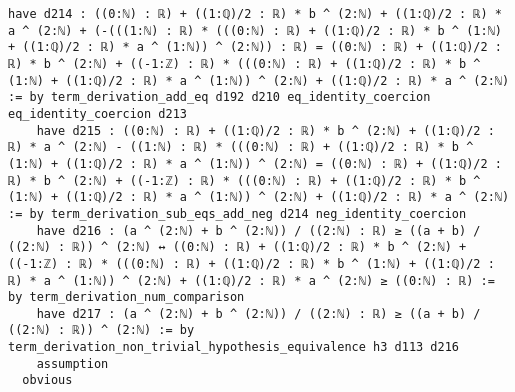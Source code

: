 \documentclass{article}
\begin{document}
\begin{tcolorbox}[colback=white!10, width=\linewidth]
\begin{lstlisting}[language=Lean4]
    have d214 : ((0:ℕ) : ℝ) + ((1:ℚ)/2 : ℝ) * b ^ (2:ℕ) + ((1:ℚ)/2 : ℝ) * a ^ (2:ℕ) + (-(((1:ℕ) : ℝ) * (((0:ℕ) : ℝ) + ((1:ℚ)/2 : ℝ) * b ^ (1:ℕ) + ((1:ℚ)/2 : ℝ) * a ^ (1:ℕ)) ^ (2:ℕ)) : ℝ) = ((0:ℕ) : ℝ) + ((1:ℚ)/2 : ℝ) * b ^ (2:ℕ) + ((-1:ℤ) : ℝ) * (((0:ℕ) : ℝ) + ((1:ℚ)/2 : ℝ) * b ^ (1:ℕ) + ((1:ℚ)/2 : ℝ) * a ^ (1:ℕ)) ^ (2:ℕ) + ((1:ℚ)/2 : ℝ) * a ^ (2:ℕ) := by term_derivation_add_eq d192 d210 eq_identity_coercion eq_identity_coercion d213
    have d215 : ((0:ℕ) : ℝ) + ((1:ℚ)/2 : ℝ) * b ^ (2:ℕ) + ((1:ℚ)/2 : ℝ) * a ^ (2:ℕ) - ((1:ℕ) : ℝ) * (((0:ℕ) : ℝ) + ((1:ℚ)/2 : ℝ) * b ^ (1:ℕ) + ((1:ℚ)/2 : ℝ) * a ^ (1:ℕ)) ^ (2:ℕ) = ((0:ℕ) : ℝ) + ((1:ℚ)/2 : ℝ) * b ^ (2:ℕ) + ((-1:ℤ) : ℝ) * (((0:ℕ) : ℝ) + ((1:ℚ)/2 : ℝ) * b ^ (1:ℕ) + ((1:ℚ)/2 : ℝ) * a ^ (1:ℕ)) ^ (2:ℕ) + ((1:ℚ)/2 : ℝ) * a ^ (2:ℕ) := by term_derivation_sub_eqs_add_neg d214 neg_identity_coercion
    have d216 : (a ^ (2:ℕ) + b ^ (2:ℕ)) / ((2:ℕ) : ℝ) ≥ ((a + b) / ((2:ℕ) : ℝ)) ^ (2:ℕ) ↔ ((0:ℕ) : ℝ) + ((1:ℚ)/2 : ℝ) * b ^ (2:ℕ) + ((-1:ℤ) : ℝ) * (((0:ℕ) : ℝ) + ((1:ℚ)/2 : ℝ) * b ^ (1:ℕ) + ((1:ℚ)/2 : ℝ) * a ^ (1:ℕ)) ^ (2:ℕ) + ((1:ℚ)/2 : ℝ) * a ^ (2:ℕ) ≥ ((0:ℕ) : ℝ) := by term_derivation_num_comparison
    have d217 : (a ^ (2:ℕ) + b ^ (2:ℕ)) / ((2:ℕ) : ℝ) ≥ ((a + b) / ((2:ℕ) : ℝ)) ^ (2:ℕ) := by term_derivation_non_trivial_hypothesis_equivalence h3 d113 d216
    assumption
  obvious

\end{lstlisting}
\end{tcolorbox}
\end{document}
